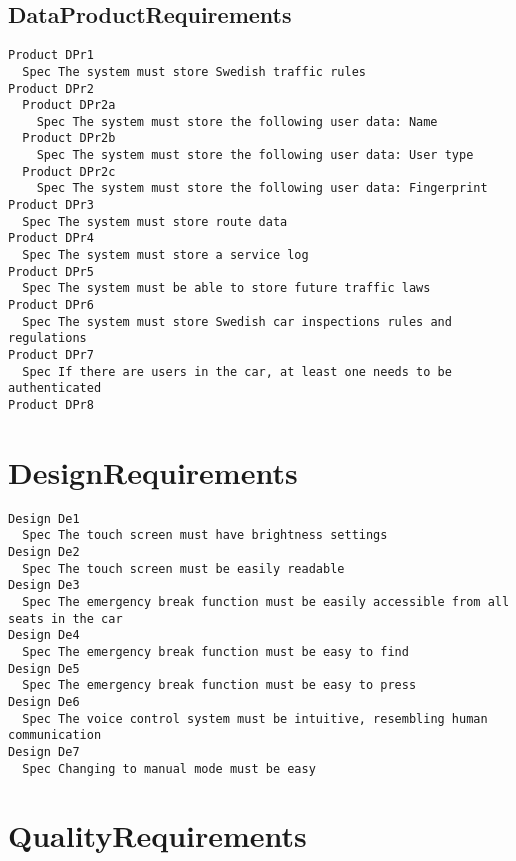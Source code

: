         
       \subsection{DataProductRequirements}


\begin{lstlisting}
Product DPr1
  Spec The system must store Swedish traffic rules
Product DPr2
  Product DPr2a
    Spec The system must store the following user data: Name
  Product DPr2b
    Spec The system must store the following user data: User type
  Product DPr2c
    Spec The system must store the following user data: Fingerprint
Product DPr3
  Spec The system must store route data
Product DPr4
  Spec The system must store a service log
Product DPr5
  Spec The system must be able to store future traffic laws
Product DPr6
  Spec The system must store Swedish car inspections rules and regulations
Product DPr7
  Spec If there are users in the car, at least one needs to be authenticated
Product DPr8

\end{lstlisting}
    
        
       \section{DesignRequirements}


\begin{lstlisting}
Design De1
  Spec The touch screen must have brightness settings
Design De2
  Spec The touch screen must be easily readable
Design De3
  Spec The emergency break function must be easily accessible from all seats in the car
Design De4
  Spec The emergency break function must be easy to find
Design De5
  Spec The emergency break function must be easy to press
Design De6
  Spec The voice control system must be intuitive, resembling human communication
Design De7
  Spec Changing to manual mode must be easy

\end{lstlisting}
    
        
       \section{QualityRequirements}


